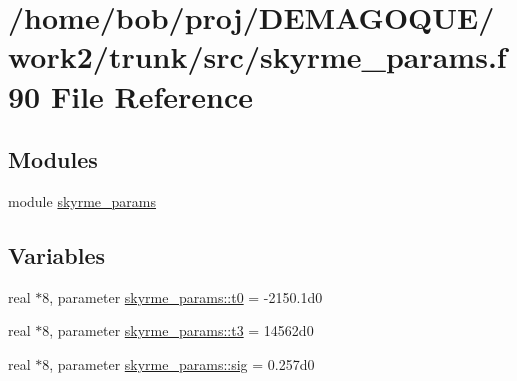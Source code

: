 \hypertarget{skyrme__params_8f90}{
\section{/home/bob/proj/DEMAGOQUE/work2/trunk/src/skyrme\_\-params.f90 File Reference}
\label{skyrme__params_8f90}
}
\subsection*{Modules}
\begin{DoxyCompactItemize}
\item 
module \hyperlink{namespaceskyrme__params}{skyrme\_\-params}
\end{DoxyCompactItemize}
\subsection*{Variables}
\begin{DoxyCompactItemize}
\item 
real $\ast$8, parameter \hyperlink{namespaceskyrme__params_a762b9bc56e40177d39d6c7eaccbbd7c7}{skyrme\_\-params::t0} = -\/2150.1d0
\item 
real $\ast$8, parameter \hyperlink{namespaceskyrme__params_af9d6dccd73b59afa0400c04cccfd3ed9}{skyrme\_\-params::t3} = 14562d0
\item 
real $\ast$8, parameter \hyperlink{namespaceskyrme__params_af2468404197070ae2e6169ff25106d0a}{skyrme\_\-params::sig} = 0.257d0
\end{DoxyCompactItemize}
